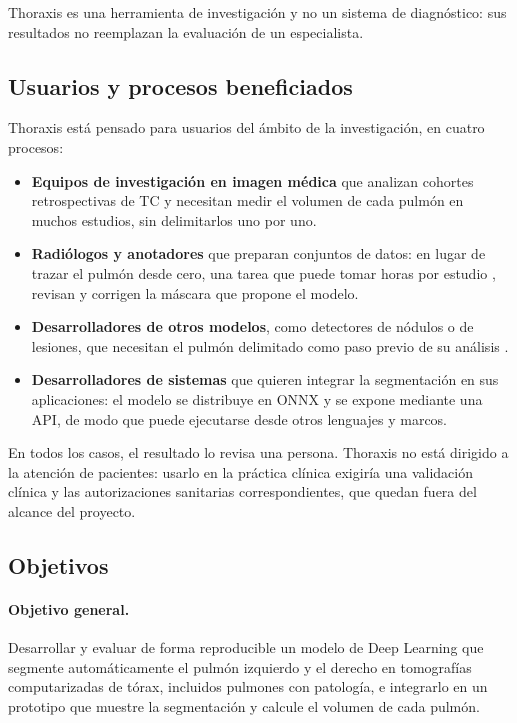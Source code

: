 Thoraxis es una herramienta de investigación y no un sistema de diagnóstico:
sus resultados no reemplazan la evaluación de un especialista.

\subsection{Usuarios y procesos beneficiados}\label{sec:users}
Thoraxis está pensado para usuarios del ámbito de la investigación, en cuatro
procesos:

\begin{itemize}
    \item \textbf{Equipos de investigación en imagen médica} que analizan
          cohortes retrospectivas de TC y necesitan medir el volumen de cada
          pulmón en muchos estudios, sin delimitarlos uno por uno.
    \item \textbf{Radiólogos y anotadores} que preparan conjuntos de datos: en
          lugar de trazar el pulmón desde cero, una tarea que puede tomar horas
          por estudio \parencite{ma2021}, revisan y corrigen la máscara que
          propone el modelo.
    \item \textbf{Desarrolladores de otros modelos}, como detectores de nódulos
          o de lesiones, que necesitan el pulmón delimitado como paso previo
          de su análisis \parencite{hofmanninger2020}.
    \item \textbf{Desarrolladores de sistemas} que quieren integrar la
          segmentación en sus aplicaciones: el modelo se distribuye en ONNX y
          se expone mediante una API, de modo que puede ejecutarse desde otros
          lenguajes y marcos.
\end{itemize}

\noindent En todos los casos, el resultado lo revisa una persona. Thoraxis no
está dirigido a la atención de pacientes: usarlo en la práctica clínica
exigiría una validación clínica y las autorizaciones sanitarias
correspondientes, que quedan fuera del alcance del proyecto.

\subsection{Objetivos}\label{sec:objectives}

\paragraph{Objetivo general.}
Desarrollar y evaluar de forma reproducible un modelo de Deep Learning que
segmente automáticamente el pulmón izquierdo y el derecho en tomografías
computarizadas de tórax, incluidos pulmones con patología, e integrarlo en un
prototipo que muestre la segmentación y calcule el volumen de cada pulmón.

